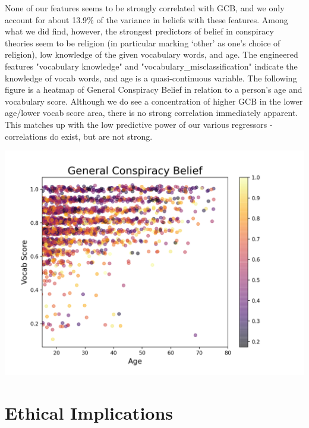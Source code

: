 \documentclass{article}[11pt]
\begin{document}
None of our features seems to be strongly correlated with GCB, and we only account for about 13.9$\%$ of the variance in beliefs with these features. Among what we did find, however, the strongest predictors of belief in conspiracy theories seem to be religion (in particular marking ‘other’ as one’s choice of religion), low knowledge of the given vocabulary words, and age. The engineered features "vocabulary knowledge" and "vocabulary\_misclassification" indicate the knowledge of vocab words, and age is a quasi-continuous variable. The following figure is a heatmap of General Conspiracy Belief in relation to a person’s age and vocabulary score. Although we do see a concentration of higher GCB in the lower age/lower vocab score area, there is no strong correlation immediately apparent. This matches up with the low predictive power of our various regressors - correlations do exist, but are not strong.
\begin{center}
\includegraphics[scale=1.2]{"../VocabAge_GCB.png"}
\end{center}
    \hypertarget{ethical-implications}{%
\section*{Ethical Implications}\label{ethical-implications}}
\end{document}
